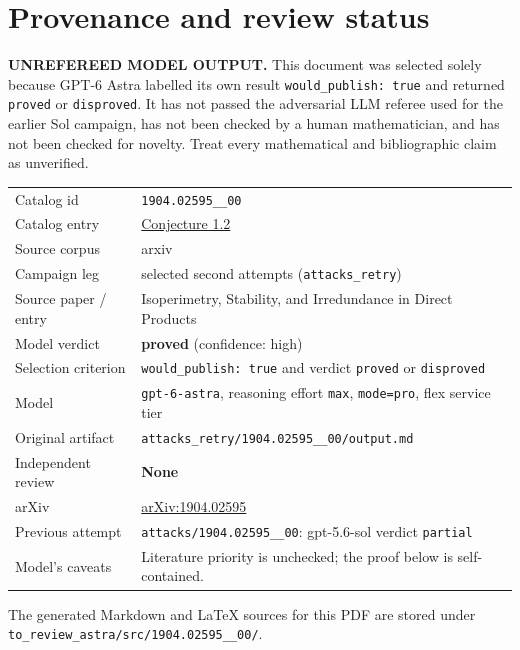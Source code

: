 \documentclass[
  11pt,
  a4paper,
]{article}
\newcounter{none} %
\begin{document}
\appendix

\section{Provenance and review
status}\label{provenance-and-review-status}

\begin{warning}

\textbf{UNREFEREED MODEL OUTPUT.} This document was selected solely
because GPT-6 Astra labelled its own result
\texttt{would\_publish:\ true} and returned \texttt{proved} or
\texttt{disproved}. It has not passed the adversarial LLM referee used
for the earlier Sol campaign, has not been checked by a human
mathematician, and has not been checked for novelty. Treat every
mathematical and bibliographic claim as unverified.

\end{warning}

{\def\LTcaptype{none} %
\begin{longtable}[]{@{}
  >{\raggedright\arraybackslash}p{}
  >{\raggedright\arraybackslash}p{}@{}}
\toprule\noalign{}
\endhead
\bottomrule\noalign{}
\endlastfoot
Catalog id & \texttt{1904.02595\_\_00} \\
Catalog entry &
\href{https://graph-theory-ai.github.io/graph-conjectures/arxiv/1904.02595__00/}{Conjecture
1.2} \\
Source corpus & arxiv \\
Campaign leg & selected second attempts (\texttt{attacks\_retry}) \\
Source paper / entry & Isoperimetry, Stability, and Irredundance in
Direct Products \\
Model verdict & \textbf{proved} (confidence: high) \\
Selection criterion & \texttt{would\_publish:\ true} and verdict
\texttt{proved} or \texttt{disproved} \\
Model & \texttt{gpt-6-astra}, reasoning effort \texttt{max},
\texttt{mode=pro}, flex service tier \\
Original artifact &
\texttt{attacks\_retry/1904.02595\_\_00/output.md} \\
Independent review & \textbf{None} \\
arXiv & \href{https://arxiv.org/abs/1904.02595}{arXiv:1904.02595} \\
Previous attempt & \texttt{attacks/1904.02595\_\_00}: gpt-5.6-sol
verdict \texttt{partial} \\
Model's caveats & Literature priority is unchecked; the proof below is
self-contained. \\
\end{longtable}
}

The generated Markdown and LaTeX sources for this PDF are stored under
\texttt{to\_review\_astra/src/1904.02595\_\_00/}.
\end{document}
